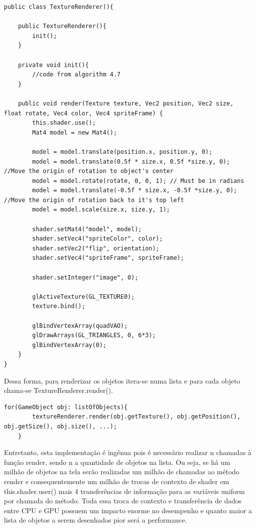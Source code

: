 \documentclass[12pt, 
openright, 
oneside, 
a4paper,    
brazil]{facom-ufu-abntex2}
\begin{document}
\begin{lstlisting}[caption=Classe renderer simples]
public class TextureRenderer(){

	public TextureRenderer(){
		init();
	}

	private void init(){
		//code from algorithm 4.7
	}

	public void render(Texture texture, Vec2 position, Vec2 size, float rotate, Vec4 color, Vec4 spriteFrame) {
		this.shader.use();
		Mat4 model = new Mat4();
		
		model = model.translate(position.x, position.y, 0);
		model = model.translate(0.5f * size.x, 0.5f *size.y, 0); //Move the origin of rotation to object's center
		model = model.rotate(rotate, 0, 0, 1); // Must be in radians
		model = model.translate(-0.5f * size.x, -0.5f *size.y, 0); //Move the origin of rotation back to it's top left
		model = model.scale(size.x, size.y, 1);
		
		shader.setMat4("model", model);
		shader.setVec4("spriteColor", color);
		shader.setVec2("flip", orientation);
		shader.setVec4("spriteFrame", spriteFrame);
		
		shader.setInteger("image", 0);
		
		glActiveTexture(GL_TEXTURE0);
		texture.bind();

		glBindVertexArray(quadVAO);
		glDrawArrays(GL_TRIANGLES, 0, 6*3);
		glBindVertexArray(0);
	}
}
\end{lstlisting}


Dessa forma, para renderizar os objetos itera-se numa lista e para cada objeto chama-se TextureRenderer.render().

\begin{lstlisting}[caption=Demonstração do render]
	for(GameObject obj: listOfObjects){
		textureRenderer.render(obj.getTexture(), obj.getPosition(), obj.getSize(), obj.size(), ...);
	}
\end{lstlisting}

Entretanto, esta implementação é ingênua pois é necessário realizar n chamadas à função render, sendo n a quantidade de objetos na lista. Ou seja, se há um milhão de objetos na tela serão realizadas um milhão de chamadas ao método render e consequentemente um milhão de trocas de contexto de shader em this.shader.user() mais 4 transferências de informação para as variáveis uniform por chamada do método. Toda essa troca de contexto e transferência de dados entre CPU e GPU possuem um impacto enorme no desempenho e quanto maior a lista de objetos a serem desenhados pior será a performance.
\end{document}
